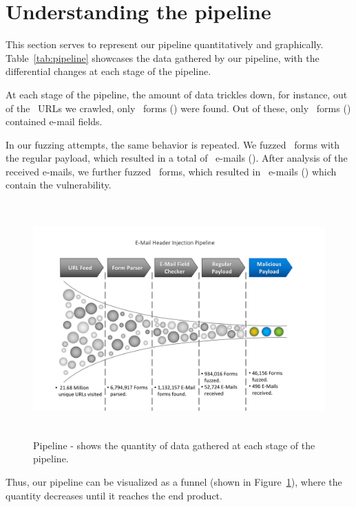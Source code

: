 \section[The Pipeline]{Understanding the pipeline}
This section serves to represent our pipeline quantitatively and graphically. Table~\ref{tab:pipeline} showcases the data gathered by our pipeline, with the differential changes at each stage of the pipeline. 

At each stage of the pipeline, the amount of data trickles down, for instance, out of the \urls\ URLs we crawled, only \forms\ forms (\formsDelta) were found. Out of these, only \emailforms\ forms (\emailformsDelta) contained e-mail fields.

In our fuzzing attempts, the same behavior is repeated. We fuzzed \fuzzed\ forms with the regular payload, which resulted in a total of \recd\ e-mails (\recdDelta). After analysis of the received e-mails, we further fuzzed \fuzzed\ forms, which resulted in \success\ e-mails (\successDelta) which contain the vulnerability.


\begin{figure}
	\centering
	\includegraphics[width=16cm, height=9cm]{Results/emailheaderpipeline}
	\caption[]{Pipeline - shows the quantity of data gathered at each stage of the pipeline.}
	\label{fig:pipeline}
\end{figure}

Thus, our pipeline can be visualized as a funnel (shown in Figure~\ref{fig:pipeline}), where the quantity decreases until it reaches the end product.
